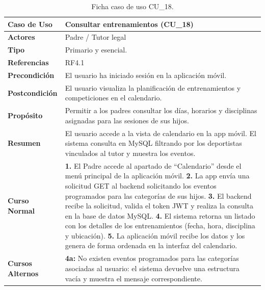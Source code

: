         \begin{table}[htbp]
        \centering
        \footnotesize
        \renewcommand{\arraystretch}{0.85}
        \begin{tabularx}{\textwidth}{|l|X|}
        \hline
        \rowcolor[HTML]{EFEFEF} 
        \textbf{Caso de Uso} & \textbf{Consultar entrenamientos (CU\_18)} \\ \hline
        \textbf{Actores} & Padre / Tutor legal \\ \hline
        \textbf{Tipo} & Primario y esencial. \\ \hline
        \textbf{Referencias} & RF4.1 \\ \hline
        \textbf{Precondición} & El usuario ha iniciado sesión en la aplicación móvil. \\ \hline
        \textbf{Postcondición} & El usuario visualiza la planificación de entrenamientos y competiciones en el calendario. \\ \hline
        \textbf{Propósito} & Permitir a los padres consultar los días, horarios y disciplinas asignadas para las sesiones de sus hijos. \\ \hline
        \textbf{Resumen} & El usuario accede a la vista de calendario en la app móvil. El sistema consulta en MySQL filtrando por los deportistas vinculados al tutor y muestra los eventos. \\ \hline
        \textbf{Curso Normal} & 
        \textbf{1.} El Padre accede al apartado de ``Calendario'' desde el menú principal de la aplicación móvil.\newline
        \textbf{2.} La app envía una solicitud GET al backend solicitando los eventos programados para las categorías de sus hijos.\newline
        \textbf{3.} El backend recibe la solicitud, valida el token JWT y realiza la consulta en la base de datos MySQL.\newline
        \textbf{4.} El sistema retorna un listado con los detalles de los entrenamientos (fecha, hora, disciplina y ubicación).\newline
        \textbf{5.} La aplicación móvil recibe los datos y los genera de forma ordenada en la interfaz del calendario. \\ \hline
        \textbf{Cursos Alternos} & 
        \textbf{4a:} No existen eventos programados para las categorías asociadas al usuario: el sistema devuelve una estructura vacía y muestra el mensaje correspondiente. \\ \hline
        \end{tabularx}
        \caption{Ficha caso de uso CU\_18.}
        \label{tab:cu_18}
        \end{table}        
        \newpage
